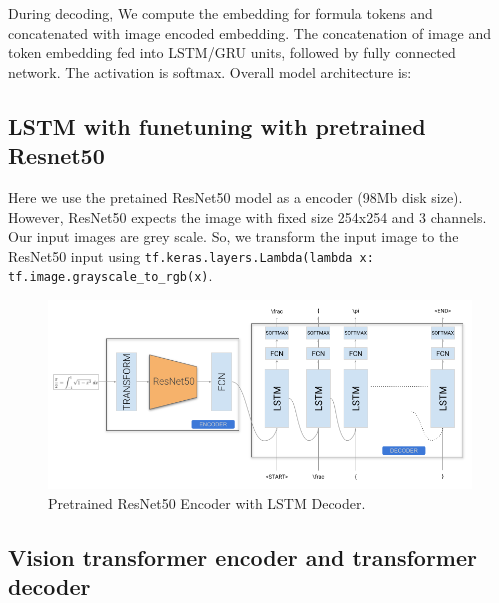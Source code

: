 \documentclass{article}
\begin{document}
During decoding, We compute the embedding for formula tokens and concatenated with image encoded embedding. The concatenation of image and token embedding fed into LSTM/GRU units, followed by fully connected network. The activation is softmax.  Overall model architecture is: 

\subsection{LSTM with funetuning with pretrained Resnet50}

Here we use the pretained ResNet50 model as a encoder (98Mb disk size). However, ResNet50 expects the image with fixed size 254x254 and 3 channels. Our input images are grey scale. So, we transform the input image to the ResNet50 input using \verb|tf.keras.layers.Lambda(lambda x: tf.image.grayscale_to_rgb(x)|.


\begin{figure}[H]
    \centering
    \includegraphics[scale=0.42]{fig_resnet_LSTM.png}
    \caption{Pretrained ResNet50 Encoder with LSTM Decoder.}
    \label{fig:resnet_lstm}
\end{figure}

\subsection{Vision transformer encoder and transformer decoder}
\end{document}
